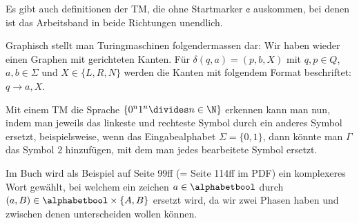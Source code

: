 Es gibt auch definitionen der TM, die ohne Startmarker $\cent$ auskommen, bei denen ist das Arbeitsband in beide Richtungen unendlich.

Graphisch stellt man Turingmaschinen folgendermassen dar:
Wir haben wieder einen Graphen mit gerichteten Kanten.
Für $\delta(q, a) = (p, b, X)$ mit $q, p \in Q$, $a, b \in \Sigma$ und $X \in \{ L, R, N \}$ werden die Kanten mit folgendem Format beschriftet:
$q \rightarrow a, X$.

Mit einem TM die Sprache $\{ 0^n 1^n \divides n \in \N \}$ erkennen kann man nun, indem man jeweils das linkeste und rechteste Symbol durch ein anderes Symbol ersetzt,
beispielsweise, wenn das Eingabealphabet $\Sigma = \{ 0, 1 \}$, dann könnte man $\Gamma$ das Symbol $2$ hinzufügen, mit dem man jedes bearbeitete Symbol ersetzt.

Im Buch wird als Beispiel auf Seite 99ff (= Seite 114ff im PDF) ein komplexeres Wort gewählt, 
bei welchem ein zeichen $a \in \alphabetbool$ durch $(a, B) \in \alphabetbool \times \{ A, B \}$ ersetzt wird, 
da wir zwei Phasen haben und zwischen denen unterscheiden wollen können.

